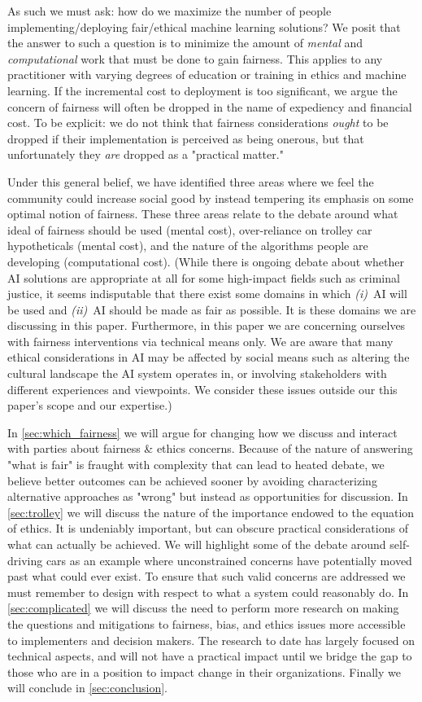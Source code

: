 \documentclass[11pt]{article}
\begin{document}
As such we must ask: how do we maximize the number of people implementing/deploying fair/ethical machine learning solutions? We posit that the answer to such a question is to minimize the amount of \textit{mental} and \textit{computational} work that must be done to gain fairness. This applies to any practitioner with varying degrees of education or training in ethics and machine learning. If the incremental cost to deployment is too significant, we argue the concern of fairness will often be dropped in the name of expediency and financial cost. To be explicit: we do not think that fairness considerations \emph{ought} to be dropped if their implementation is perceived as being onerous, but that unfortunately they \emph{are} dropped as a "practical matter."

Under this general belief, we have identified three areas where we feel the community could increase social good by instead tempering its emphasis on some optimal notion of fairness.
These three areas relate to the debate around what ideal of fairness should be used (mental cost), over-reliance on trolley car hypotheticals (mental cost), and the nature of the algorithms people are developing (computational cost).
(While there is ongoing debate about whether AI solutions are appropriate at all for some high-impact fields such as criminal justice, it seems indisputable that there exist some domains in which \textit{(i)}~AI will be used and \textit{(ii)}~AI should be made as fair as possible. It is these domains we are discussing in this paper. Furthermore, in this paper we are concerning ourselves with fairness interventions via technical means only. We are aware that many ethical considerations in AI may be affected by social means such as altering the cultural landscape the AI system operates in, or involving stakeholders with different experiences and viewpoints. We consider these issues outside our this paper's scope and our expertise.)

In \autoref{sec:which_fairness} we will argue for changing how we discuss and interact with parties about fairness \& ethics concerns. Because of the nature of answering "what is fair" is fraught with complexity that can lead to heated debate, we believe better outcomes can be achieved sooner by avoiding characterizing alternative approaches as "wrong" but instead as opportunities for discussion. In \autoref{sec:trolley} we will discuss the nature of the importance endowed to the equation of ethics. It is undeniably important, but can obscure practical considerations of what can actually be achieved. We will highlight some of the debate around self-driving cars as an example where unconstrained concerns have potentially moved past what could ever exist. To ensure that such valid concerns are addressed we must remember to design with respect to what a system could reasonably do. In \autoref{sec:complicated} we will discuss the need to perform more research on making the questions and mitigations to fairness, bias, and ethics issues more accessible to implementers and decision makers. The research to date has largely focused on technical aspects, and will not have a practical impact until we bridge the gap to those who are in a position to impact change in their organizations. Finally we will conclude in \autoref{sec:conclusion}.  
\end{document}
